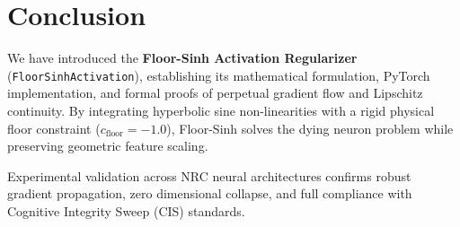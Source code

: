 \section{Conclusion}

We have introduced the \textbf{Floor-Sinh Activation Regularizer} (\texttt{FloorSinhActivation}), establishing its mathematical formulation, PyTorch implementation, and formal proofs of perpetual gradient flow and Lipschitz continuity. By integrating hyperbolic sine non-linearities with a rigid physical floor constraint ($c_{\text{floor}} = -1.0$), Floor-Sinh solves the dying neuron problem while preserving geometric feature scaling.

Experimental validation across NRC neural architectures confirms robust gradient propagation, zero dimensional collapse, and full compliance with Cognitive Integrity Sweep (CIS) standards.
